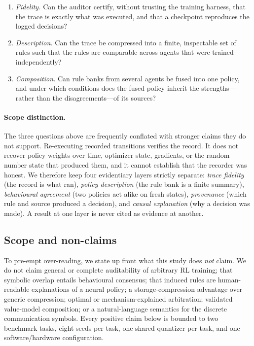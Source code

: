 \documentclass[11pt]{article}
\begin{document}
\begin{enumerate}
  \item \emph{Fidelity.} Can the auditor certify, without trusting the training harness, that the
        trace is exactly what was executed, and that a checkpoint reproduces the logged decisions?
  \item \emph{Description.} Can the trace be compressed into a finite, inspectable set of rules such
        that the rules are comparable across agents that were trained independently?
  \item \emph{Composition.} Can rule banks from several agents be fused into one policy, and under
        which conditions does the fused policy inherit the strengths---rather than the
        disagreements---of its sources?
\end{enumerate}

\paragraph{Scope distinction.}
The three questions above are frequently conflated with stronger claims they do not support.
Re-executing recorded transitions verifies the record. It does not recover policy weights over time,
optimizer state, gradients, or the random-number state that produced them, and it cannot establish
that the recorder was honest. We therefore keep four evidentiary layers strictly separate:
\emph{trace fidelity} (the record is what ran), \emph{policy description} (the rule bank is a finite
summary), \emph{behavioural agreement} (two policies act alike on fresh states), \emph{provenance}
(which rule and source produced a decision), and \emph{causal explanation} (why a decision was made).
A result at one layer is never cited as evidence at another.

\subsection{Scope and non-claims}
\label{sec:prelim:nonclaims}

To pre-empt over-reading, we state up front what this study does \emph{not} claim. We do not claim
general or complete auditability of arbitrary RL training; that symbolic overlap entails behavioural
consensus; that induced rules are human-readable explanations of a neural policy; a storage-compression
advantage over generic compression; optimal or mechanism-explained arbitration; validated value-model
composition; or a natural-language semantics for the discrete communication symbols. Every positive
claim below is bounded to two benchmark tasks, eight seeds per task, one shared quantizer per task, and
one software/hardware configuration.
\end{document}
